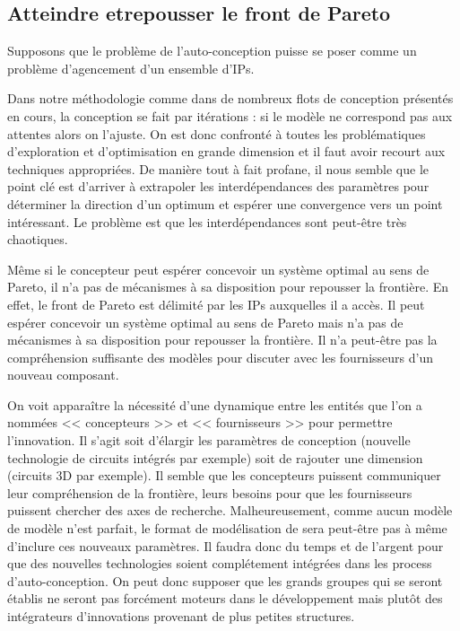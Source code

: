 \documentclass[11pt]{article}
\begin{document}
\subsection{Atteindre etrepousser le front de Pareto}

Supposons que le problème de l'auto-conception puisse se poser comme un problème
d'agencement d'un ensemble d'IPs.

Dans notre méthodologie comme dans de nombreux flots de conception présentés en
cours, la conception se fait par itérations : si le modèle ne correspond pas aux
attentes alors on l'ajuste. On est donc confronté à toutes les problématiques
d'exploration et d'optimisation en grande dimension et il faut avoir recourt aux
techniques appropriées. De manière tout à fait profane, il nous semble que le 
point clé est d'arriver à extrapoler les interdépendances des paramètres pour
déterminer la direction d'un optimum et espérer une convergence vers un point
intéressant. Le problème est que les interdépendances sont peut-être très 
chaotiques.

Même si le concepteur peut espérer concevoir un système optimal au sens de 
Pareto, il n'a pas de mécanismes à sa disposition pour repousser la frontière. 
En effet, le front de Pareto est délimité par les IPs auxquelles il a accès. 
Il peut espérer concevoir un système optimal au sens de Pareto mais n'a pas de 
mécanismes à sa disposition pour repousser la frontière. Il n'a peut-être pas la
compréhension suffisante des modèles pour discuter avec les fournisseurs d'un
nouveau composant.

On voit apparaître la nécessité d'une dynamique entre les entités que l'on a 
nommées << concepteurs >> et << fournisseurs >> pour permettre l'innovation.
Il s'agit soit d'élargir les paramètres de conception (nouvelle technologie de 
circuits intégrés par exemple) soit de rajouter une dimension (circuits 3D par 
exemple). Il semble que les concepteurs puissent communiquer leur compréhension 
de la frontière, leurs besoins pour que les fournisseurs puissent chercher des 
axes de recherche. Malheureusement, comme aucun modèle de modèle n'est parfait, 
le format de modélisation de sera peut-être pas à même d'inclure ces nouveaux 
paramètres. Il faudra donc du temps et de l'argent pour que des nouvelles 
technologies soient complétement intégrées dans les process d'auto-conception. 
On peut donc supposer que les grands groupes qui se seront établis ne seront pas
forcément moteurs dans le développement mais plutôt des intégrateurs
d'innovations provenant de plus petites structures.
\end{document}
